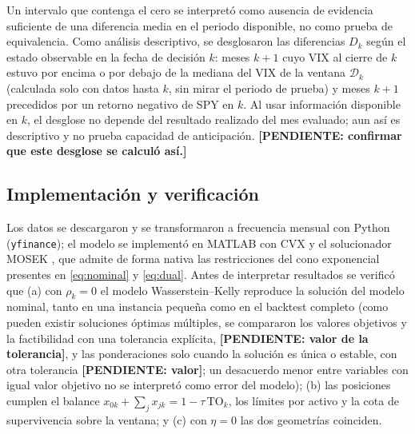  Un intervalo que contenga el cero se interpretó como ausencia de evidencia suficiente de una diferencia media en el periodo disponible, no como prueba de equivalencia. 
Como análisis descriptivo, se desglosaron las diferencias $D_{k}$ según el estado observable en la fecha de decisión $k$: meses $k+1$ cuyo VIX al cierre de $k$ estuvo por encima o por debajo de la mediana del VIX de la ventana $\mathcal D_k$ (calculada solo con datos hasta $k$, sin mirar el periodo de prueba) y meses $k+1$ precedidos por un retorno negativo de SPY en $k$. Al usar información disponible en $k$, el desglose no depende del resultado realizado del mes evaluado; aun así es descriptivo y no prueba capacidad de anticipación. \textbf{[PENDIENTE: confirmar que este desglose se calculó así.]}


\subsection{Implementación y verificación}\label{sec:impl}

Los datos se descargaron y se transformaron a frecuencia mensual con Python (\texttt{yfinance}); el modelo se implementó en MATLAB con CVX \citep{grantboyd} y el solucionador MOSEK \citep{mosek}, que admite de forma nativa las restricciones del cono exponencial presentes en \eqref{eq:nominal} y \eqref{eq:dual}. 
Antes de interpretar resultados se verificó que (a) con $\rho_k=0$ el modelo Wasserstein--Kelly reproduce la solución del modelo nominal, tanto en una instancia pequeña como en el backtest completo (como pueden existir soluciones óptimas múltiples, se compararon los valores objetivos y la factibilidad con una tolerancia explícita, \textbf{[PENDIENTE: valor de la tolerancia]}, y las ponderaciones solo cuando la solución es única o estable, con otra tolerancia \textbf{[PENDIENTE: valor]}; un desacuerdo menor entre variables con igual valor objetivo no se interpretó como error del modelo);
 (b) las posiciones cumplen el balance $x_{0k}+\sum_j x_{jk}=1-\tau\,\mathrm{TO}_k$, los límites por activo y la cota de supervivencia sobre la ventana; y (c) con $\eta=0$ las dos geometrías coinciden.

